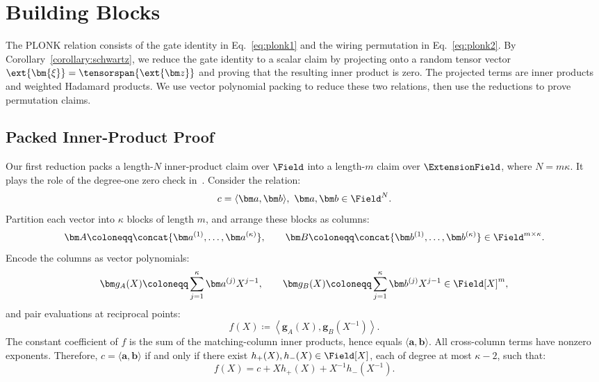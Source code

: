 \section{Building Blocks}
\label{sec:blocks}

The PLONK relation consists of the gate identity in
Eq.~\eqref{eq:plonk1} and the wiring permutation in
Eq.~\eqref{eq:plonk2}. By Corollary~\ref{corollary:schwartz},
we reduce the gate identity to a scalar claim by projecting onto
a random tensor vector
\(
    \ext{\bm{\xi}}
    =
    \tensorspan{\ext{\bm z}}
\)
and proving that the resulting inner product is zero. The projected
terms are inner products and weighted Hadamard products.
We use vector polynomial packing to reduce these two relations,
then use the reductions to prove permutation claims.

\subsection{Packed Inner-Product Proof}
\label{sec:ip}

Our first reduction packs a length-\(N\) inner-product claim over
\(\Field\) into a length-\(m\) claim over \(\ExtensionField\),
where \(N=m\kappa\). It plays the role of the degree-one zero
check in~\cite{iacr/DaoT24}.
Consider the relation:
\[
    c=\langle\bm a,\bm b\rangle,
    ~
    \bm a,\bm b\in\Field^N.
\]
Partition each vector into \(\kappa\) blocks of length \(m\), and
arrange these blocks as columns:
\begin{equation}
\label{eq:matAB}
    \bm A
    \coloneqq
    \concat{
        \bm a^{(1)},\ldots,\bm a^{(\kappa)}
    },
    \qquad
    \bm B
    \coloneqq
    \concat{
        \bm b^{(1)},\ldots,\bm b^{(\kappa)}
    }
    \in\Field^{m\times\kappa}.
\end{equation}
Encode the columns as vector polynomials:
\[
    \bm g_A(X)
    \coloneqq
    \sum_{j=1}^{\kappa}\bm a^{(j)}X^{j-1},
    \qquad
    \bm g_B(X)
    \coloneqq
    \sum_{j=1}^{\kappa}\bm b^{(j)}X^{j-1}
    \in\Field[X]^m,
\]
and pair evaluations at reciprocal points:
\begin{equation}
    f(X)
    \coloneqq
    \left\langle
        \bm g_A(X),\bm g_B(X^{-1})
    \right\rangle.
\label{eq:ip-laurent-polynomial}
\end{equation}
The constant coefficient of \(f\) is the sum of the matching-column
inner products, hence equals \(\langle\bm a,\bm b\rangle\).
All cross-column terms have nonzero exponents. Therefore,
\(c=\langle\bm a,\bm b\rangle\) if and only if there exist
\(h_+(X),h_-(X)\in\Field[X]\), each of degree at most
\(\kappa-2\), such that:
\begin{equation}
    f(X)
    =
    c
    +Xh_+(X)
    +X^{-1}h_-(X^{-1}).
\label{eq:ip-correction-identity}
\end{equation}


